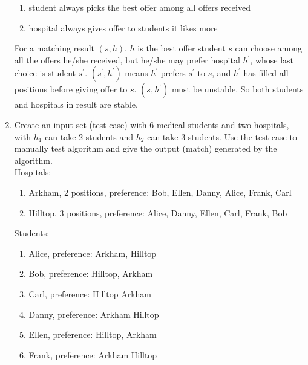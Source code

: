 \documentclass[14pt, a4paper]{article}
\begin{document}
\begin{enumerate}
    \begin{enumerate}
        \item student always picks the best offer among all offers received
        \item hospital always gives offer to students it likes more
    \end{enumerate}

For a matching result $(s, h)$, $h$ is the best offer student $s$ can choose 
among all the offers he/she received, but he/she may prefer hospital $h^{\prime}$, 
whose last choice is student $s^{\prime}$. $(s^{\prime}, h^{\prime})$ 
means $h^{\prime}$ prefers $s^{\prime}$ to $s$, and $h^{\prime}$ has filled 
all positions before giving offer to $s$. $(s, h^{\prime})$ must be unstable. 
So both students and hospitals in result are stable.
    
\item Create an input set (test case) with 6 medical students and two hospitals, with $h_1$ can take 2 students and $h_2$ can take 3 students. Use the test case to manually test algorithm and give the output (match) generated by the algorithm. \\

    Hospitals:
    \begin{enumerate}
        \item Arkham, 2 positions, preference: Bob, Ellen, Danny, Alice, Frank, Carl
        \item Hilltop, 3 positions, preference: Alice, Danny, Ellen, Carl, Frank, Bob
    \end{enumerate}
    
    Students:
    \begin{enumerate}
        \item Alice, preference: Arkham, Hilltop
        \item Bob, preference: Hilltop, Arkham
        \item Carl, preference: Hilltop Arkham
        \item Danny, preference: Arkham Hilltop
        \item Ellen, preference: Hilltop, Arkham
        \item Frank, preference: Arkham Hilltop
    \end{enumerate}


\end{enumerate}
\end{document}
